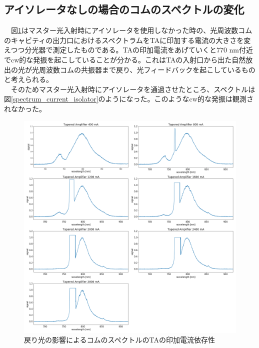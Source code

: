 \documentclass[uplatex, dvipdfmx, a4paper, report, papersize, 11pt]{jsbook}
\begin{document}
\subsection{アイソレータなしの場合のコムのスペクトルの変化}
　図\ref{spectrum_current_MODORI}はマスター光入射時にアイソレータを使用しなかった時の、光周波数コムのキャビティの出力口におけるスペクトラムをTAに印加する電流の大きさを変えつつ分光器で測定したものである。TAの印加電流をあげていくと$770$ nm付近でcw的な発振を起こしていることが分かる。これはTAの入射口から出た自然放出の光が光周波数コムの共振器まで戻り、光フィードバックを起こしているものと考えられる。\\
　そのためマスター光入射時にアイソレータを通過させたところ、スペクトルは図\ref{spectrum_current_isolator}のようになった。このようなcw的な発振は観測されなかった。
\begin{figure}[H]
 \begin{center}
  \includegraphics[width=140mm]{figures/chapter4/spectrum_current_MODORI.png}
\end{center}
 \caption{戻り光の影響によるコムのスペクトルのTAの印加電流依存性}
 \label{spectrum_current_MODORI}
\end{figure}
\end{document}
